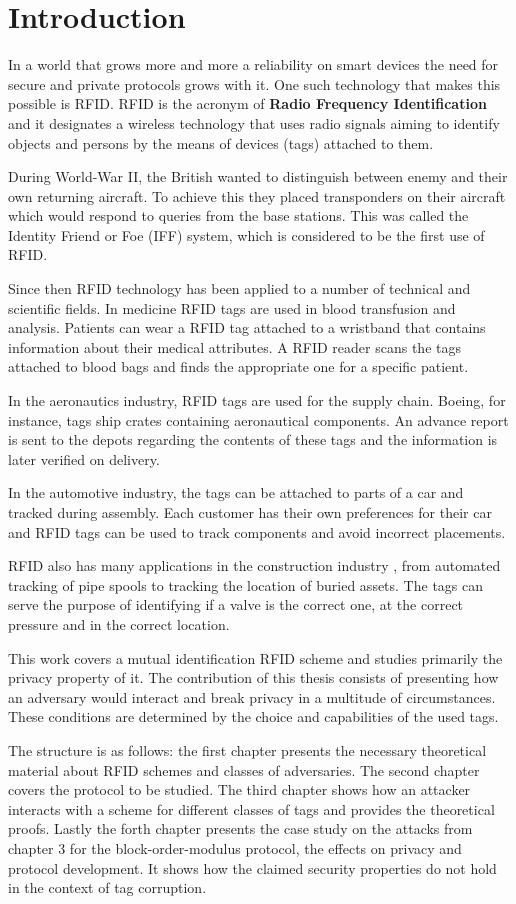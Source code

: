 \chapter*{Introduction} 

    In a world that grows more and more a reliability on smart devices the need for secure and private protocols grows with it. One 
such technology that makes this possible is RFID. RFID is the acronym of \textbf{Radio Frequency Identification} and it designates
a wireless technology that uses radio signals aiming to identify objects and persons by the means of devices (tags) attached to them.

    During World-War II, the British wanted to distinguish between enemy and their own returning aircraft. To achieve this they placed transponders
on their aircraft which would respond to queries from the base stations. This was called the Identity Friend or Foe (IFF) system, which is considered to be the
first use of RFID.

    Since then RFID technology has been applied to a number of technical and scientific fields. In medicine RFID tags are used in blood 
transfusion and analysis. Patients can wear a RFID tag attached to a wristband that contains information about their medical attributes. 
A RFID reader scans the tags attached to blood bags and finds the appropriate one for a specific patient. 

In the aeronautics industry, RFID tags are used for the supply chain. Boeing, for instance, tags ship crates containing aeronautical
components. An advance report is sent to the depots regarding the contents of these tags and the information is later verified on delivery.

In the automotive industry, the tags can be attached to parts of a car and tracked during assembly. Each customer has their own preferences
for their car and RFID tags can be used to track components and avoid incorrect placements. 

RFID also has many applications in the construction industry \cite{Domdouzis}, from automated tracking of pipe spools to tracking the 
location of buried assets. The tags can serve the purpose of identifying if a valve is the correct one, at the correct pressure and 
in the correct location. 

This work covers a mutual identification RFID scheme and studies primarily the privacy property of it. The contribution of this thesis
consists of presenting how an adversary would interact and break privacy in a multitude of circumstances. These conditions are determined
by the choice and capabilities of the used tags. 

The structure is as follows: the first chapter presents the necessary theoretical material about RFID schemes and classes of adversaries.
The second chapter covers the protocol to be studied. The third chapter shows how an attacker interacts with a scheme for different 
classes of tags and provides the theoretical proofs. Lastly the forth chapter presents the case study on the attacks from chapter 3 
for the block-order-modulus protocol, the effects on privacy and protocol development. It shows how the claimed security properties do 
not hold in the context of tag corruption. 